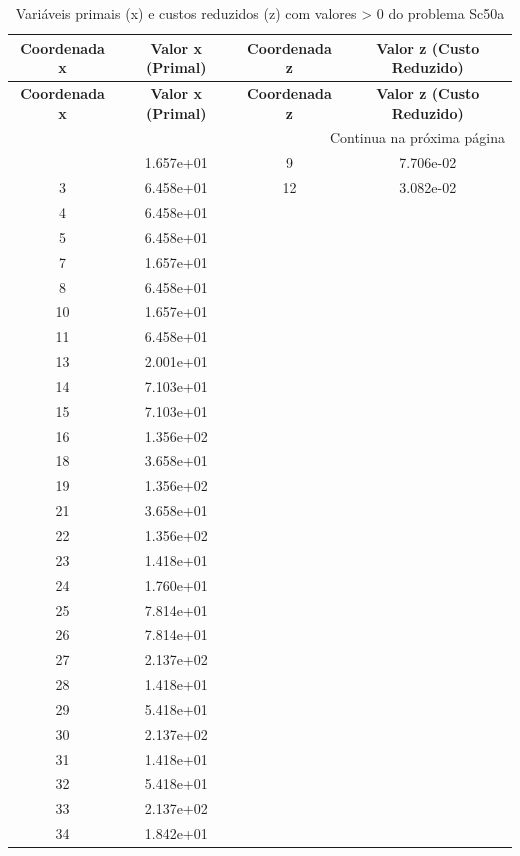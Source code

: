 \documentclass[12pt]{article}
\begin{document}
\begin{longtable}{@{}cccc@{}}
\caption{Variáveis primais (x) e custos reduzidos (z) com valores > 0 do problema Sc50a} \\
\toprule
\textbf{Coordenada x} & \textbf{Valor x (Primal)} & \textbf{Coordenada z} & \textbf{Valor z (Custo Reduzido)} \\
\midrule
\endfirsthead

\toprule
\textbf{Coordenada x} & \textbf{Valor x (Primal)} & \textbf{Coordenada z} & \textbf{Valor z (Custo Reduzido)} \\
\midrule
\endhead

\midrule \multicolumn{4}{r}{{Continua na próxima página}} \\ \midrule
\endfoot

\bottomrule
\endlastfoot
2 & 1.657e+01 & 9 & 7.706e-02 \\
3 & 6.458e+01 & 12 & 3.082e-02 \\
4 & 6.458e+01 &  &  \\
5 & 6.458e+01 &  &  \\
7 & 1.657e+01 &  &  \\
8 & 6.458e+01 &  &  \\
10 & 1.657e+01 &  &  \\
11 & 6.458e+01 &  &  \\
13 & 2.001e+01 &  &  \\
14 & 7.103e+01 &  &  \\
15 & 7.103e+01 &  &  \\
16 & 1.356e+02 &  &  \\
18 & 3.658e+01 &  &  \\
19 & 1.356e+02 &  &  \\
21 & 3.658e+01 &  &  \\
22 & 1.356e+02 &  &  \\
23 & 1.418e+01 &  &  \\
24 & 1.760e+01 &  &  \\
25 & 7.814e+01 &  &  \\
26 & 7.814e+01 &  &  \\
27 & 2.137e+02 &  &  \\
28 & 1.418e+01 &  &  \\
29 & 5.418e+01 &  &  \\
30 & 2.137e+02 &  &  \\
31 & 1.418e+01 &  &  \\
32 & 5.418e+01 &  &  \\
33 & 2.137e+02 &  &  \\
34 & 1.842e+01 &  &  \\

\end{longtable}
\end{document}
